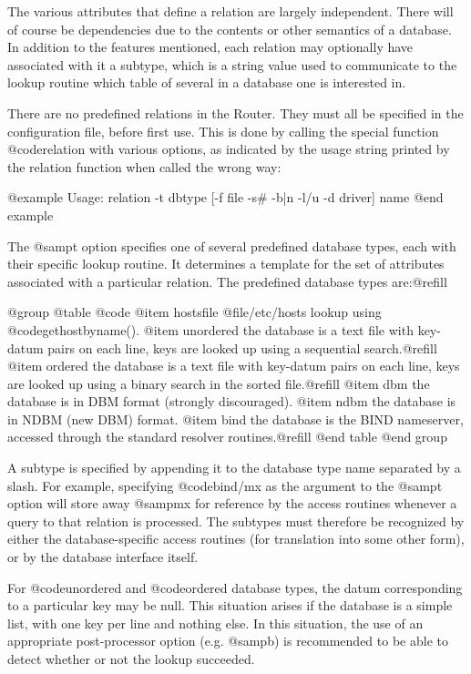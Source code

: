 {{The various attributes that define a relation are largely independent.
There will of course be dependencies due to the contents or other
semantics of a database.
In addition to the features mentioned, each relation may optionally
have associated with it a subtype, which is a string value used to
communicate to the lookup routine which table of several in a database
one is interested in.

There are no predefined relations in the Router.
They must all be specified in the configuration file, before first use.
This is done by calling the special function @code{relation} with
various options, as indicated by the usage string printed by the relation
function when called the wrong way:

@example
Usage: relation -t dbtype [-f file -s# -b|n -l/u -d driver] name
@end example

The @samp{t} option specifies one of several predefined database types, each
with their specific lookup routine.  It determines a template for the set of
attributes associated with a particular relation.  The predefined database
types are:@refill

@group
@table @code
@item hostsfile
@file{/etc/hosts} lookup using @code{gethostbyname()}.
@item unordered
the database is a text file with key-datum pairs on each line,
keys are looked up using a sequential search.@refill
@item ordered
the database is a text file with key-datum pairs on each line, keys are
looked up using a binary search in the sorted file.@refill
@item dbm
the database is in DBM format (strongly discouraged).
@item ndbm
the database is in NDBM (new DBM) format.
@item bind
the database is the BIND nameserver, accessed through the standard resolver
routines.@refill
@end table
@end group

A subtype is specified by appending it to the database type name
separated by a slash.
For example, specifying @code{bind/mx} as the argument to
the @samp{t} option will store away @samp{mx} for reference by
the access routines whenever a query to that relation is processed.
The subtypes must therefore be recognized by either the database-specific
access routines (for translation into some other form), or by
the database interface itself.

For @code{unordered} and @code{ordered} database types, the datum
corresponding to a particular key may be null.
This situation arises if the database is a simple list, with one
key per line and nothing else.
In this situation, the use of an appropriate post-processor option
(e.g. @samp{b}) is recommended to be able to detect whether or
not the lookup succeeded.

}}
